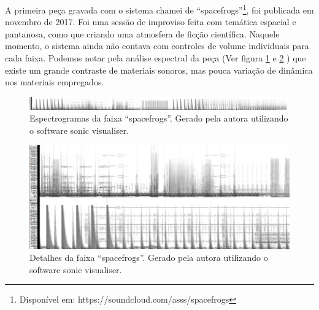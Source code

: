 A primeira peça gravada com o sistema chamei de ``spacefrogs''\footnote{Disponível em: https://soundcloud.com/asss/spacefrogs}, foi publicada em novembro de 2017. Foi uma sessão de improviso feita com temática espacial e pantanosa, como que criando uma atmosfera de ficção científica. Naquele momento, o sistema ainda não contava com controles de volume individuais para cada faixa. Podemos notar pela análise espectral da peça (Ver figura \ref{fig:spacefrogs} e \ref{fig:spacefrogsdt} ) que existe um grande contraste de materiais sonoros, mas pouca variação de dinâmica nos materiais empregados.

\begin{figure}

\includegraphics[width=1\textwidth]{pictures/cap4/spacefrogs_spectrogram}
\caption{Espectrogramas da faixa ``spacefrogs''. Gerado pela autora utilizando o software sonic visualiser.}
\label{fig:spacefrogs}
\end{figure}

\begin{figure}

\includegraphics[width=1\textwidth]{pictures/cap4/spacefrogs_spectrogram_dt}
\caption{Detalhes da faixa ``spacefrogs''. Gerado pela autora utilizando o software sonic visualiser.}
\label{fig:spacefrogsdt}
\end{figure}






